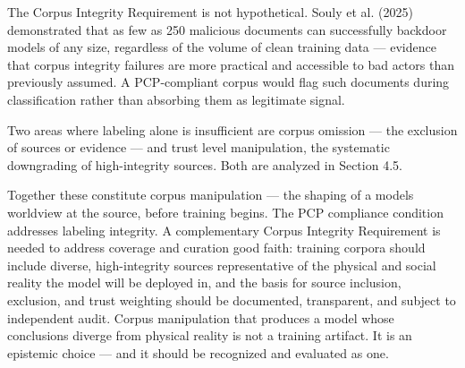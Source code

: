 \documentclass[
]{article}
\begin{document}
The Corpus Integrity Requirement is not hypothetical. Souly et al.
(2025) demonstrated that as few as 250 malicious documents can
successfully backdoor models of any size, regardless of the volume of
clean training data --- evidence that corpus integrity failures are more
practical and accessible to bad actors than previously assumed. A
PCP-compliant corpus would flag such documents during classification
rather than absorbing them as legitimate signal.

Two areas where labeling alone is insufficient are corpus omission ---
the exclusion of sources or evidence --- and trust level manipulation,
the systematic downgrading of high-integrity sources. Both are analyzed
in Section 4.5.

Together these constitute corpus manipulation --- the shaping of a
model\textquotesingle s worldview at the source, before training begins.
The PCP compliance condition addresses labeling integrity. A
complementary Corpus Integrity Requirement is needed to address coverage
and curation good faith: training corpora should include diverse,
high-integrity sources representative of the physical and social reality
the model will be deployed in, and the basis for source inclusion,
exclusion, and trust weighting should be documented, transparent, and
subject to independent audit. Corpus manipulation that produces a model
whose conclusions diverge from physical reality is not a training
artifact. It is an epistemic choice --- and it should be recognized and
evaluated as one.
\end{document}
